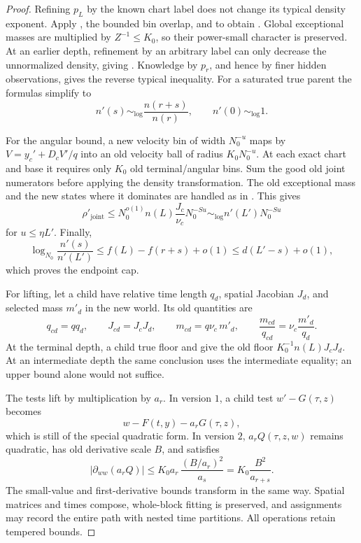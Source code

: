 \begin{proof}
Refining \(p_L\) by the known chart label does not change
its typical density exponent.  Apply
, the bounded bin overlap,
and  to obtain
.  Global exceptional
masses are multiplied by \(Z^{-1}\le K_0\), so their
power-small character is preserved.
At an earlier depth, refinement by an arbitrary label
can only decrease the unnormalized density, giving
.  Knowledge by
\(p_r\), and hence by finer hidden observations, gives
the reverse typical inequality.
For a saturated true parent the formulas simplify to
\[
 n'(s)\sim_{\log}\frac{n(r+s)}{n(r)},\qquad
 n'(0)\sim_{\log}1.
\]

For the angular bound, a new velocity bin of width
\(N_0^{-u}\) maps by
\(V=y_c'+D_cV'/q\) into an old velocity ball of radius
\(K_0N_0^{-u}\).  At each exact chart and base it requires
only \(K_0\) old terminal/angular bins.
Sum the good old joint numerators before applying the
density transformation.  The old exceptional mass and
the new states where it dominates are handled as in
.  This gives
\[
 \rho'_{\mathrm{joint}}\le
 N_0^{o(1)}n(L)\frac{J_c}{\nu_c}N_0^{-Su}
 \sim_{\log} n'(L')N_0^{-Su}
\]
for \(u\le\eta L'\).
Finally,
\[
 \log_{N_0}\frac{n'(s)}{n'(L')}
 \le f(L)-f(r+s)+o(1)
 \le d(L'-s)+o(1),
\]
which proves the endpoint cap.

For lifting, let a child have relative time length
\(q_d\), spatial Jacobian \(J_d\), and selected mass
\(m'_d\) in the new world.  Its old quantities are
\begin{equation}
 q_{cd}=qq_d,\qquad J_{cd}=J_cJ_d,\qquad
 m_{cd}=q\nu_c\,m'_d,\qquad
 \frac{m_{cd}}{q_{cd}}=
       \nu_c\frac{m'_d}{q_d}.
 \label{a01:composition-masses}
\end{equation}
At the terminal depth, a child true floor and
 give the old floor
\(K_0^{-1}n(L)J_cJ_d\).
At an intermediate depth the same conclusion uses the
intermediate equality; an upper bound alone would not
suffice.

The tests lift by multiplication by \(a_r\).
In version \(1\), a child test \(w'-G(\tau,z)\) becomes
\[
 w-F(t,y)-a_rG(\tau,z),
\]
which is still of the special quadratic form.
In version \(2\), \(a_rQ(\tau,z,w)\) remains quadratic,
has old derivative scale \(B\), and satisfies
\[
 |\partial_{ww}(a_rQ)|
 \le K_0a_r\,\frac{(B/a_r)^2}{a_s}
 =K_0\frac{B^2}{a_{r+s}}.
\]
The small-value and first-derivative bounds transform
in the same way.  Spatial matrices and times compose,
whole-block fitting is preserved, and assignments may
record the entire path with nested time partitions.
All operations retain tempered bounds.
\end{proof}

